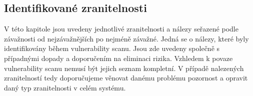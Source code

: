 \newpage
\subsection{Identifikované zranitelnosti}
V této kapitole jsou uvedeny jednotlivé zranitelnosti a nálezy seřazené podle závažnosti od nejzávažnějších po nejméně závažné. Jedná se o nálezy, které byly identifikovány během vulnerability scanu. Jsou zde uvedeny společně s případnými dopady a doporučením na eliminaci rizika. Vzhledem k povaze vulnerability scanu nemusí být jejich seznam kompletní. V případě nalezených zranitelností tedy doporučujeme věnovat danému problému pozornost a opravit daný typ zranitelnosti v celém systému.
